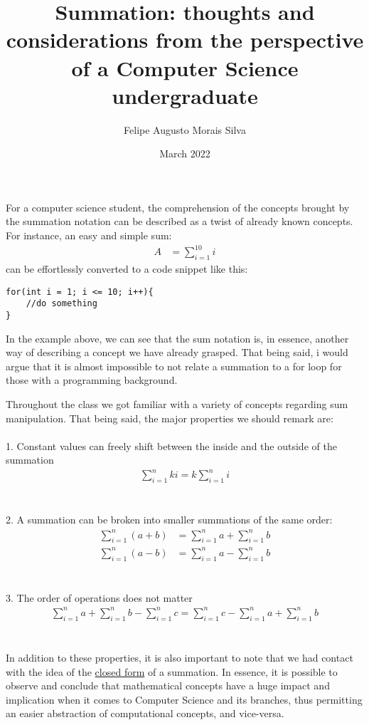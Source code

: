 \documentclass{article}
\title{Summation: thoughts and considerations from the perspective of a Computer Science undergraduate}
\author{Felipe  Augusto Morais Silva}
\date{March 2022}
\begin{document}
\maketitle
For a computer science student, the comprehension of the concepts brought by the summation notation can be described as a twist of already known concepts.
For instance, an easy and simple sum:
\begin{align*}
  A &= \sum_{i=1}^{10} i
\end{align*}
can be effortlessly converted to a code snippet like this:
\begin{lstlisting}
for(int i = 1; i <= 10; i++){
    //do something
}
\end{lstlisting}
In the example above, we can see that the sum notation is, in essence, another way of describing a concept we have already grasped. That being said, i would argue that it is almost impossible to not relate a summation to a for loop for those with a programming background.

Throughout the class we got familiar with a variety of concepts regarding sum manipulation. That being said, the major properties we should remark are:
\\%
\\
1. Constant values can freely shift between the inside and the outside of the summation
\begin{align*}
    \sum_{i=1}^{n}ki = k\sum_{i=1}^{n}i 
\end{align*}
\\
\\
2. A summation can be broken into smaller summations of the same order:
\begin{align*}
    \sum_{i=1}^{n}(a+b) &= \sum_{i=1}^{n}a + \sum_{i=1}^{n}b
\end{align*}
\begin{align*}
\sum_{i=1}^{n}(a-b) &= \sum_{i=1}^{n}a - \sum_{i=1}^{n}b
\end{align*}
\\
\\
3. The order of operations does not matter
\begin{align*}
    \sum_{i=1}^{n}a + \sum_{i=1}^{n}b - \sum_{i=1}^{n}c = \sum_{i=1}^{n}c - \sum_{i=1}^{n}a + \sum_{i=1}^{n}b
\end{align*}
\\ 
\\
In addition to these properties, it is also important to note that we had contact with the idea of the \href{https://math.stackexchange.com/questions/2550043/how-to-convert-a-summation-into-a-closed-form}{closed form} of a summation.
In essence, it is possible to observe and conclude that mathematical concepts have a huge impact and 
implication when it comes to Computer Science and its branches, thus permitting an easier abstraction of 
computational concepts, and vice-versa.
\end{document}
